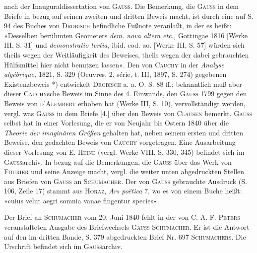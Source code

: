 nach der Inauguraldissertation von \textsc{Gauss}. Die Bemerkung, die \textsc{Gauss} in dem Briefe
in bezug auf seinen zweiten und dritten Beweis macht, ist durch eine auf S. 94 des Buches von
\textsc{Drobisch} befindliche Fußnote veranlaßt, in der es heißt: »Desselben berühmten Geometers
\textit{dem. nova altera etc.,} Gottingae 1816 [Werke III, S. 31] und \textit{demonstratio tertia,}
ibid. eod. ao. [Werke III, S. 57] würden sich theils wegen der Weitläufigkeit des Beweises,
theils wegen der dabei gebrauchten Hülfsmittel hier nicht benutzen lassen«.
Den von \textsc{Cauchy} in der \textit{Analyse algébrique,} 1821, S. 329
(Oeuvres, 2. série, t. III, 1897, S. 274) gegebenen Existenzbeweis *) entwickelt
\textsc{Drobisch} a. a. O. S. 88 ff.; bekanntlich muß aber dieser \textsc{Cauchy}sche Beweis
im Sinne des 4. Einwands, den \textsc{Gauss} 1799 gegen den Beweis von \textsc{d’Alembert}
erhoben hat (Werke III, S. 10), vervollständigt werden, vergl. was \textsc{Gauss} in dem Briefe
[4.] über den Beweis von \textsc{Clausen} bemerkt. \textsc{Gauss} selbst hat in einer Vorlesung,
die er von Neujahr bis Ostern 1840 über die \textit{Theorie der imaginären Größen} gehalten hat,
neben seinem ersten und dritten Beweise, den gedachten Beweis von \textsc{Cauchy} vorgetragen.
Eine Ausarbeitung dieser Vorlesung von \textsc{E. Heine} (vergl. Werke VIII, S. 330, 345)
befindet sich im \textsc{Gauss}archiv. In bezug auf die Bemerkungen, die \textsc{Gauss} über das
Werk von \textsc{Fourier} und seine Anzeige macht, vergl. die weiter unten abgedruckten Stellen
aus Briefen von \textsc{Gauss} an \textsc{Schumacher}. Der von \textsc{Gauss} gebrauchte Ausdruck
 (S. 106, Zeile 17) stammt aus \textsc{Horaz}, \textit{Ars poëtica} 7,
wo es von einem Buche heißt: »cuius velut aegri somnia vanae fingentur species«.

Der Brief an \textsc{Schumacher} vom 20. Juni 1840 fehlt in der von C. A. F. \textsc{Peters}
veranstalteten Ausgabe des Briefwechsels \textsc{Gauss-Schumacher}. Er ist die Antwort auf den
im dritten Bande, S. 379 abgedruckten Brief Nr. 697 \textsc{Schumachers}.
Die Urschrift befindet sich im \textsc{Gauss}archiv.

